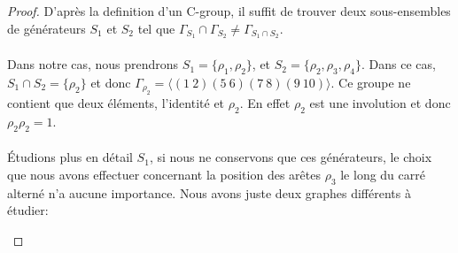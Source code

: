 \begin{proof}
  D'après la definition d'un C-group, il suffit de trouver deux sous-ensembles de générateurs $S_1$ et $S_2$ tel que $\Gamma_{S_1} \cap \Gamma_{S_2} \neq \Gamma_{S_1 \cap S_2}$.

  \paragraph{}
  Dans notre cas, nous prendrons $S_1 = \{\rho_1, \rho_2\}$, et $S_2 = \{\rho_2, \rho_3, \rho_4\}$. Dans ce cas, $S_1 \cap S_2 = \{\rho_2\}$  et donc $\Gamma_{\rho_2} = \langle (1\ 2)(5\ 6)(7\ 8)(9\ 10) \rangle$. Ce groupe ne contient que deux éléments, l'identité et $\rho_2$. En effet $\rho_2$ est une involution et donc $\rho_2\rho_2 = 1$.

  \paragraph{}
  Étudions plus en détail $S_1$, si nous ne conservons que ces générateurs, le choix que nous avons effectuer concernant la position des arêtes $\rho_3$ le long du carré alterné n'a aucune importance. Nous avons juste deux graphes différents à étudier:

  \begin{figure}[H]
    \begin{center}
\end{center}
\end{figure}
\end{proof}
